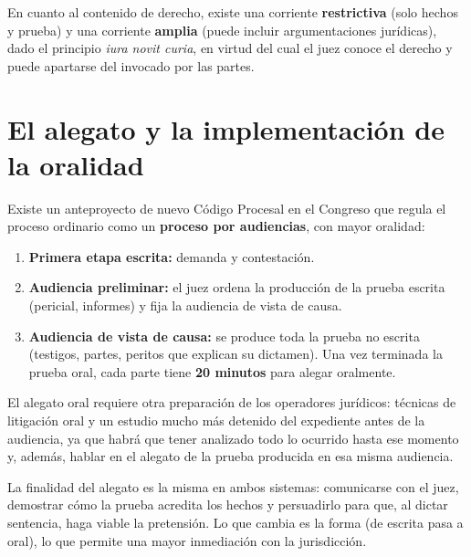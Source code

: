 \documentclass[12pt,oneside]{book}
\begin{document}
En cuanto al contenido de derecho, existe una corriente \textbf{restrictiva} (solo hechos y prueba) y una corriente \textbf{amplia} (puede incluir argumentaciones jurídicas), dado el principio \textit{iura novit curia}, en virtud del cual el juez conoce el derecho y puede apartarse del invocado por las partes.

\section{El alegato y la implementación de la oralidad}

Existe un anteproyecto de nuevo Código Procesal en el Congreso que regula el proceso ordinario como un \textbf{proceso por audiencias}, con mayor oralidad:

\begin{enumerate}
    \item \textbf{Primera etapa escrita:} demanda y contestación.
    \item \textbf{Audiencia preliminar:} el juez ordena la producción de la prueba escrita (pericial, informes) y fija la audiencia de vista de causa.
    \item \textbf{Audiencia de vista de causa:} se produce toda la prueba no escrita (testigos, partes, peritos que explican su dictamen). Una vez terminada la prueba oral, cada parte tiene \textbf{20 minutos} para alegar oralmente.
\end{enumerate}

El alegato oral requiere otra preparación de los operadores jurídicos: técnicas de litigación oral y un estudio mucho más detenido del expediente antes de la audiencia, ya que habrá que tener analizado todo lo ocurrido hasta ese momento y, además, hablar en el alegato de la prueba producida en esa misma audiencia.

La finalidad del alegato es la misma en ambos sistemas: comunicarse con el juez, demostrar cómo la prueba acredita los hechos y persuadirlo para que, al dictar sentencia, haga viable la pretensión. Lo que cambia es la forma (de escrita pasa a oral), lo que permite una mayor inmediación con la jurisdicción.
\end{document}
